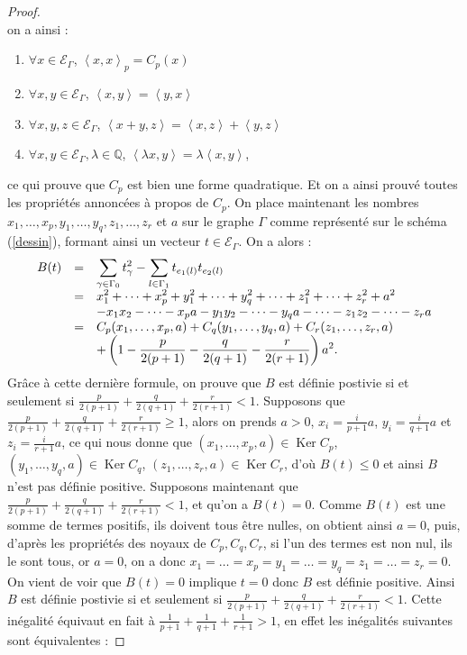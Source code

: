 \documentclass[a4paper,10pt]{article}
\DeclareMathOperator{\Ker}{Ker}
\newcommand{\ps}[2]{\left\langle#1,#2\right\rangle}
\newcommand{\EG}{\mathscr{E}_\Gamma}
\newcommand{\dps}{\displaystyle}
\begin{document}
\begin{proof}
\[	\]
on a ainsi :
\begin{enumerate}
	\item $\forall x\in\EG$, $\ps{x}{x}_p=C_p(x)$
	\item $\forall x,y\in\EG$, $\ps{x}{y}=\ps{y}{x}$
	\item $\forall x,y,z\in\EG$, $\ps{x+y}{z}=\ps{x}{z}+\ps{y}{z}$
	\item $\forall x,y\in\EG,\lambda\in\mathbb Q$, $\ps{\lambda x}{y}=\lambda\ps{x}{y}$,
\end{enumerate}
ce qui prouve que $C_p$ est bien une forme quadratique. Et on a ainsi prouvé toutes les propriétés annoncées à propos de $C_p$. On place maintenant les nombres $x_1,\dots,x_p,y_1,\dots,y_q,z_1,\dots,z_r$ et $a$ sur le graphe $\Gamma$ comme représenté sur le schéma (\ref{dessin}), formant ainsi un vecteur $t\in\EG$. On a alors :
\[
\begin{array}{>{\dps}r>{\dps}l>{\dps}l}
	B(t)&=& \sum_{\gamma\in\Gamma_0}t_\gamma^2-\sum_{l\in\Gamma_1}t_{e_1(l)}t_{e_2(l)}\\
	&=& x_1^2+\dots+x_p^2+y_1^2+\dots+y_q^2+\dots+z_1^2+\dots+z_r^2+a^2\\
	&& -x_1x_2-\dots-x_pa-y_1y_2-\dots-y_qa-\dots-z_1z_2-\dots-z_ra\\
	&=& C_p(x_1,\dots,x_p,a)+C_q(y_1,\dots,y_q,a)+C_r(z_1,\dots,z_r,a)\\
	&& +\left(1-\frac{p}{2(p+1)}-\frac{q}{2(q+1)}-\frac{r}{2(r+1)}\right)a^2.\\
\end{array}
\]
Gr\^ace à cette dernière formule, on prouve que $B$ est définie postivie si et seulement si $\frac{p}{2(p+1)}+\frac{q}{2(q+1)}+\frac{r}{2(r+1)}<1$. Supposons que $\frac{p}{2(p+1)}+\frac{q}{2(q+1)}+\frac{r}{2(r+1)}\geq1$, alors on prends $a>0$, $x_i=\frac{i}{p+1}a$, $y_i=\frac{i}{q+1}a$ et $z_i=\frac{i}{r+1}a$, ce qui nous donne que $(x_1,\dots,x_p,a)\in\Ker C_p$, $(y_1,\dots,y_q,a)\in\Ker C_q$, $(z_1,\dots,z_r,a)\in\Ker C_r$, d'où $B(t)\leq0$ et ainsi $B$ n'est pas définie positive. Supposons maintenant que $\frac{p}{2(p+1)}+\frac{q}{2(q+1)}+\frac{r}{2(r+1)}<1$, et qu'on a $B(t)=0$. Comme $B(t)$ est une somme de termes positifs, ils doivent tous être nulles, on obtient ainsi $a=0$, puis, d'après les propriétés des noyaux de $C_p,C_q,C_r$, si l'un des termes est non nul, ils le sont tous, or $a=0$, on a donc $x_1=\dots= x_p=y_1=\dots=y_q=z_1=\dots=z_r=0$. On vient de voir que $B(t)=0$ implique $t=0$ donc $B$ est définie positive. Ainsi $B$ est définie postivie si et seulement si $\frac{p}{2(p+1)}+\frac{q}{2(q+1)}+\frac{r}{2(r+1)}<1$. Cette inégalité équivaut en fait à $\frac{1}{p+1}+\frac{1}{q+1}+\frac{1}{r+1}>1$, en effet les inégalités suivantes sont équivalentes :

\end{proof}
\end{document}
